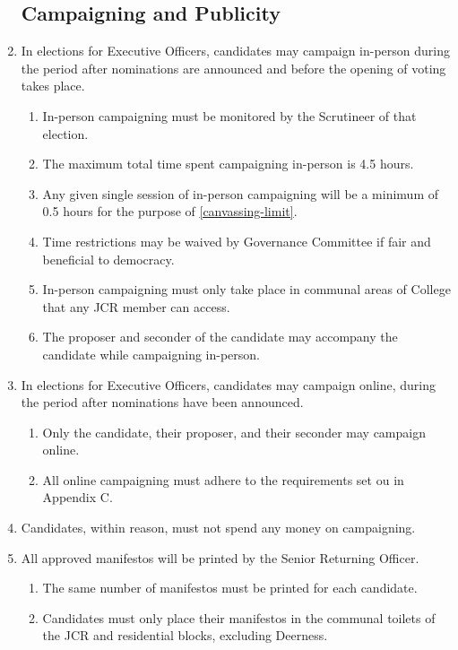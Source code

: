 \documentclass[12pt]{article}
\begin{document}
\begin{enumerate}
    \subsection{Campaigning and Publicity}
    \item In elections for Executive Officers, candidates may campaign in-person during the period after nominations are announced and before the opening of voting takes place.
    \begin{enumerate}
        \item In-person campaigning must be monitored by the Scrutineer of that election.
        \item\label{canvassing-limit} The maximum total time spent campaigning in-person is 4.5 hours.
        \item Any given single session of in-person campaigning will be a minimum of 0.5 hours for the purpose of \ref{canvassing-limit}.
        \item Time restrictions may be waived by Governance Committee if fair and beneficial to democracy.
        \item In-person campaigning must only take place in communal areas of College that any JCR member can access.
        \item The proposer and seconder of the candidate may accompany the candidate while campaigning in-person.
    \end{enumerate}
    \item In elections for Executive Officers, candidates may campaign online, during the period after nominations have been announced.
    \begin{enumerate}
        \item Only the candidate, their proposer, and their seconder may campaign online.
        \item All online campaigning must adhere to the requirements set ou in Appendix C.
    \end{enumerate}
    \item Candidates, within reason, must not spend any money on campaigning.
    \item All approved manifestos will be printed by the Senior Returning Officer.
    \begin{enumerate}
        \item The same number of manifestos must be printed for each candidate.
        \item Candidates must only place their manifestos in the communal toilets of the JCR and residential blocks, excluding Deerness.

\end{enumerate}
\end{enumerate}
\end{document}
